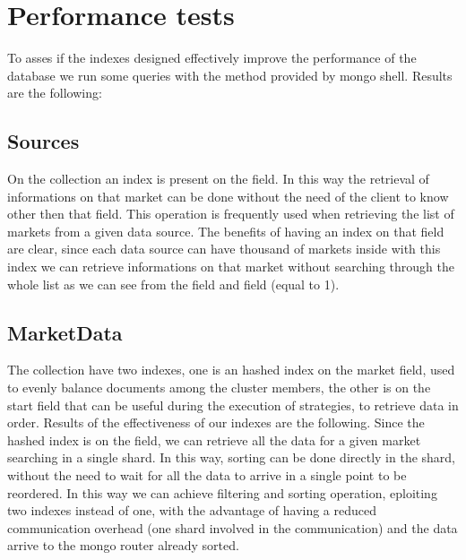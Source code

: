\section{Performance tests}\label{sec:performancetests}
To asses if the indexes designed effectively improve the performance of the
database we run some queries with the  method provided
by mongo shell. Results are the following:

\subsection{Sources}
On the collection  an index is present on the  field. In this
way the retrieval of informations on that market can be done without the need of
the client to know other then that field.
This operation is frequently used when retrieving the list of markets from a
given data source. The benefits of having an index on that field are clear,
since each data source can have thousand of markets inside with this index we can
retrieve informations on that market without searching through
the whole list as we can see from the 
field and  field (equal to 1).



\subsection{MarketData}

The collection  have two indexes, one is an hashed index on the market
field, used to evenly balance documents among the cluster
members, the other is on the start field that can be useful during the execution
of strategies, to retrieve data in order.
Results of the effectiveness of our indexes are the following.
Since the hashed index is on the  field, we can retrieve all the data for
a given market searching in a single shard. In this way, sorting can be done
directly in the shard, without the need to wait for all the data to arrive in a
single point to be reordered. In this way we can achieve filtering and sorting
operation, eploiting two indexes instead of one, with the advantage of having a
reduced communication overhead (one shard involved in the communication) and the
data arrive to the mongo router already sorted.


